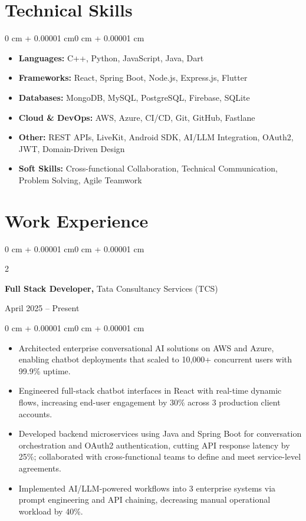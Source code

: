 \documentclass[10pt, letterpaper]{article}
\newenvironment{highlights}{
    \begin{itemize}[
        topsep=0.06 cm,
        parsep=0.06 cm,
        partopsep=0pt,
        itemsep=0pt,
        leftmargin=0 cm + 10pt
    ]
}{
    \end{itemize}
}
\newenvironment{onecolentry}{
    \begin{adjustwidth}{0 cm + 0.00001 cm}{0 cm + 0.00001 cm}
}{
    \end{adjustwidth}
}
\newenvironment{twocolentry}[2][]{
    \onecolentry
    \def\secondColumn{#2}
    \setcolumnwidth{\fill, 4.5 cm}
    \begin{paracol}{2}
}{
    \switchcolumn \raggedleft \secondColumn
    \end{paracol}
    \endonecolentry
}
\begin{document}
\section{Technical Skills}
\begin{onecolentry}
    \begin{highlights}
        \item \textbf{Languages:} C++, Python, JavaScript, Java, Dart 
        \item \textbf{Frameworks:} React, Spring Boot, Node.js, Express.js, Flutter
        \item \textbf{Databases:} MongoDB, MySQL, PostgreSQL, Firebase, SQLite 
        \item \textbf{Cloud \& DevOps:} AWS, Azure, CI/CD, Git, GitHub, Fastlane
        \item \textbf{Other:} REST APIs, LiveKit, Android SDK, AI/LLM Integration, OAuth2, JWT, Domain-Driven Design
        \item \textbf{Soft Skills:} Cross-functional Collaboration, Technical Communication, Problem Solving, Agile Teamwork
    \end{highlights}
\end{onecolentry}

\section{Work Experience}

\begin{twocolentry}{April 2025 -- Present}
    \textbf{Full Stack Developer,} Tata Consultancy Services (TCS)
\end{twocolentry}
\vspace{0.07 cm}
\begin{onecolentry}
    \begin{highlights}
        \item Architected enterprise conversational AI solutions on AWS and Azure, enabling chatbot deployments that scaled to 10,000+ concurrent users with 99.9\% uptime.
        \item Engineered full-stack chatbot interfaces in React with real-time dynamic flows, increasing end-user engagement by 30\% across 3 production client accounts.
        \item Developed backend microservices using Java and Spring Boot for conversation orchestration and OAuth2 authentication, cutting API response latency by 25\%; collaborated with cross-functional teams to define and meet service-level agreements.
        \item Implemented AI/LLM-powered workflows into 3 enterprise systems via prompt engineering and API chaining, decreasing manual operational workload by 40\%.
    \end{highlights}
\end{onecolentry}
\end{document}

